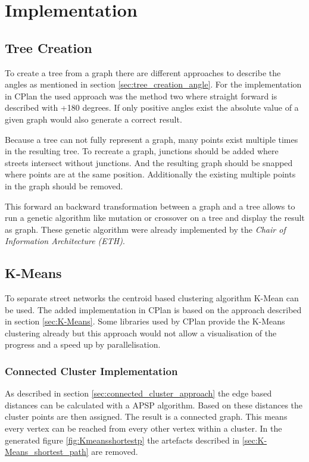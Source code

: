 \pagebreak
\chapter{Implementation}
\section{Tree Creation}
To create a tree from a graph there are different approaches to describe the angles as mentioned in section \ref{sec:tree_creation_angle}. For the implementation in CPlan the used approach was the method two where straight forward is described with +180 degrees. If only positive angles exist the absolute value of a given graph would also generate a correct result.

Because a tree can not fully represent a graph, many points exist multiple times in the resulting tree. To recreate a graph, junctions should be added where streets intersect without junctions. And the resulting graph should be snapped where points are at the same position. Additionally the existing multiple points in the graph should be removed.

This forward an backward transformation between a graph and a tree allows to run a genetic algorithm like mutation or crossover on a tree and display the result as graph. These genetic algorithm were already implemented by the \textit{Chair of Information Architecture (ETH)}.

\pagebreak
\section{K-Means}
To separate street networks the centroid based clustering algorithm K-Mean can be used. The added implementation in CPlan \citep{cPlan:2015} is based on the approach described in section \ref{sec:K-Means}. Some libraries used by CPlan provide the K-Means clustering already but this approach would not allow a visualisation of the progress and a speed up by parallelisation.

\subsection{Connected Cluster Implementation} \label{sec:K-Means_shortest_path_impl}
As described in section \ref{sec:connected_cluster_approach} the edge based distances can be calculated with a \gls{APSP} algorithm. Based on these distances the cluster points are then assigned. The result is a connected graph. This means every vertex can be reached from every other vertex within a cluster. In the generated figure \ref{fig:Kmeansshortestp} the artefacts described in \ref{sec:K-Means_shortest_path} are removed.

